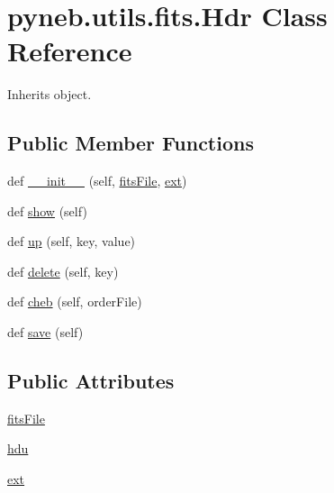 \hypertarget{classpyneb_1_1utils_1_1fits_1_1_hdr}{}\section{pyneb.\+utils.\+fits.\+Hdr Class Reference}
\label{classpyneb_1_1utils_1_1fits_1_1_hdr}


Inherits object.

\subsection*{Public Member Functions}
\begin{DoxyCompactItemize}
\item 
def \hyperlink{classpyneb_1_1utils_1_1fits_1_1_hdr_aeddad5ffc5d8877569e445ca876e5654}{\+\_\+\+\_\+init\+\_\+\+\_\+} (self, \hyperlink{classpyneb_1_1utils_1_1fits_1_1_hdr_a7c4dc491907edb52649262563df2e23c}{fits\+File}, \hyperlink{classpyneb_1_1utils_1_1fits_1_1_hdr_a1c2f102effab05a497e3a21ed3291359}{ext})
\item 
def \hyperlink{classpyneb_1_1utils_1_1fits_1_1_hdr_a7dea491de86cd7fd74be3451369c690d}{show} (self)
\item 
def \hyperlink{classpyneb_1_1utils_1_1fits_1_1_hdr_aae5b01b9bc70e2787f31825ff63152a6}{up} (self, key, value)
\item 
def \hyperlink{classpyneb_1_1utils_1_1fits_1_1_hdr_a64e91aa976f1b312026927e9bef237a9}{delete} (self, key)
\item 
def \hyperlink{classpyneb_1_1utils_1_1fits_1_1_hdr_a8b3404b437c53986a68387da48a423f3}{cheb} (self, order\+File)
\item 
def \hyperlink{classpyneb_1_1utils_1_1fits_1_1_hdr_ae194eaf4a7c6a8aed7926ebad50d7901}{save} (self)
\end{DoxyCompactItemize}
\subsection*{Public Attributes}
\begin{DoxyCompactItemize}
\item 
\hyperlink{classpyneb_1_1utils_1_1fits_1_1_hdr_a7c4dc491907edb52649262563df2e23c}{fits\+File}
\item 
\hyperlink{classpyneb_1_1utils_1_1fits_1_1_hdr_a23de98701ac30e7c56654f92d9956fca}{hdu}
\item 
\hyperlink{classpyneb_1_1utils_1_1fits_1_1_hdr_a1c2f102effab05a497e3a21ed3291359}{ext}
\end{DoxyCompactItemize}


